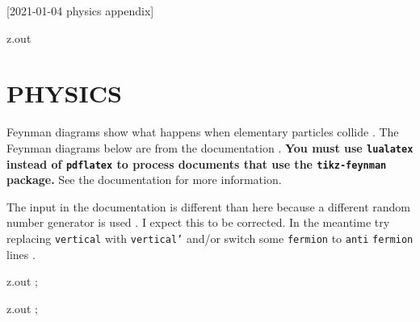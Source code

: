 [2021-01-04 physics appendix]

\begin{VerbatimOut}{z.out}
\chapter{PHYSICS}

Feynman diagrams show what happens
when elementary particles collide
\cite{feynman-diagram}.
The Feynman diagrams below are from the
 documentation \cite{ellis2016}.
\textbf{%
  You must use \texttt{lualatex} instead
  of \texttt{pdflatex}
  to process documents that use the \texttt{tikz-feynman} package.%
}
See the documentation for more information.

The input
in the documentation
is different than here because a different random number generator
is used \cite{menke2019}.
I expect this to be corrected.
In the meantime try replacing \texttt{vertical}
with \texttt{vertical'}
and/or switch some \texttt{fermion}
to \texttt{anti} \texttt{fermion} lines \cite{ellis2017}.
\end{VerbatimOut}

\MyIOT

\begin{VerbatimOut}{z.out}
;
\end{VerbatimOut}

\MyIOT

\begin{VerbatimOut}{z.out}
;
\end{VerbatimOut}

\MyIOT
